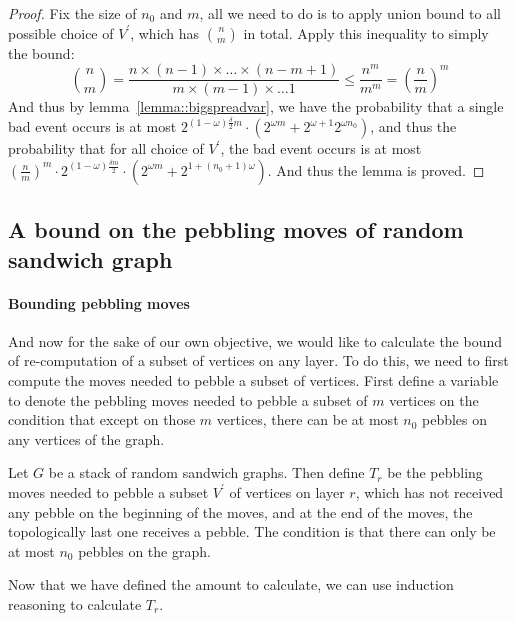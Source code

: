 \begin{proof}
  Fix the size of $n_0$ and $m$, all we need to do is to apply union bound to all possible choice of $V^\prime$, which has $\binom{n}{m}$ in total.
  Apply this inequality to simply the bound:
  \begin{equation}
    \binom{n}{m} = \frac{n \times (n-1) \times \dots \times (n-m+1)}{m \times (m-1) \times \dots 1} \leq
    \frac{n^m}{m^m} = (\frac{n}{m})^m
  \end{equation}
  And thus by lemma~\ref{lemma::bigspreadvar}, we have the probability that a single bad event occurs is at most
  $2^{(1-\omega)\frac{\delta}{2}m} \cdot (2^{\omega m}+2^{\omega+1}2^{\omega n_0})$, and thus the probability that
  for all choice of $V^\prime$, the bad event occurs is at most
  $(\frac{n}{m})^m \cdot 2^{(1-\omega)\frac{\delta m}{2}} \cdot (2^{\omega m} + 2^{1 + (n_0 + 1) \omega})$.
  And thus the lemma is proved.
\end{proof}

\subsection{A bound on the pebbling moves of random sandwich graph}
\paragraph{Bounding pebbling moves}
And now for the sake of our own objective, we would like to calculate the bound of re-computation of a subset of vertices on any layer. To do this, we
need to first compute the moves needed to pebble a subset of vertices. First define a variable to denote the pebbling moves needed to pebble a subset of
$m$ vertices on the condition that except on those $m$ vertices, there can be at most $n_0$ pebbles on any vertices of the graph.

\begin{definition}\label{def::Tr}
  Let $G$ be a stack of random sandwich graphs. Then define $T_r$ be the pebbling moves needed to pebble a subset $V^\prime$ of vertices on layer $r$, which has
  not received any pebble on the beginning of the moves, and at the end of the moves, the topologically last one receives a pebble. The condition is that there
  can only be at most $n_0$ pebbles on the graph.
\end{definition}

Now that we have defined the amount to calculate, we can use induction reasoning to calculate $T_r$.

